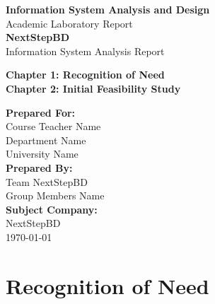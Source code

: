 \documentclass[12pt,a4paper]{report}
\begin{document}
\begin{titlepage}
    \centering
    \vspace*{1cm}

    {\Large \textbf{Information System Analysis and Design}}\\[0.4cm]
    {\large Academic Laboratory Report}\\[1.4cm]

    {\Huge \textbf{NextStepBD}}\\[0.4cm]
    {\Large Information System Analysis Report}\\[1.2cm]

    \begin{tcolorbox}[
        colback=secondary,
        colframe=primary,
        width=0.9\textwidth,
        arc=4mm,
        boxrule=1pt
    ]
        \centering
        {\Large \textbf{Chapter 1: Recognition of Need}}\\[0.2cm]
        {\Large \textbf{Chapter 2: Initial Feasibility Study}}
    \end{tcolorbox}

    \vspace{1.4cm}

    \textbf{Prepared For:}\\
    Course Teacher Name\\
    Department Name\\
    University Name\\[1.2cm]

    \textbf{Prepared By:}\\
    Team NextStepBD\\
    Group Members Name\\[1.2cm]

    \textbf{Subject Company:}\\
    NextStepBD\\[1cm]

    \vfill
    {\large \today}
\end{titlepage}

\tableofcontents
\listoffigures
\listoftables
\newpage

\chapter{Recognition of Need}
\end{document}
